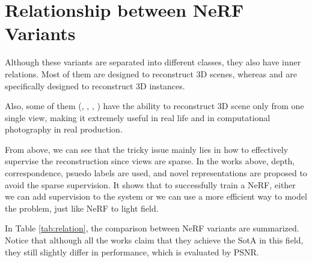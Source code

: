 \documentclass[10pt,twocolumn,letterpaper]{article}
\begin{document}
\section{Relationship between NeRF Variants}

Although these variants are separated into different classes, they also have inner relations. Most of them are designed to reconstruct 3D scenes, whereas \cite{SRF} and \cite{mueller2022autorf} are specifically designed to reconstruct 3D instances.

Also, some of them (\cite{yu2020pixelnerf}, \cite{lin2023visionnerf}, \cite{mueller2022autorf}, \cite{Xu_2022_SinNeRF}) have the ability to reconstruct 3D scene only from one single view, making it extremely useful in real life and in computational photography in real production.

From above, we can see that the tricky issue mainly lies in how to effectively supervise the reconstruction since views are sparse. In the works above, depth, correspondence, psuedo labels are used, and novel representations are proposed to avoid the sparse supervision. It shows that to successfully train a NeRF, either we can add supervision to the system or we can use a more efficient way to model the problem, just like NeRF to light field.

In Table \ref{tab:relation}, the comparison between NeRF variants are summarized. Notice that although all the works claim that they achieve the SotA in this field, they still slightly differ in performance, which is evaluated by PSNR.
\end{document}
